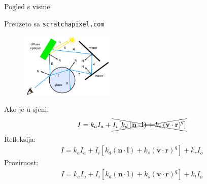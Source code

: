 \documentclass[9pt]{beamer}
\begin{document}
\begin{frame}{Pogled s visine}
\begin{tiny}
	Preuzeto sa \texttt{scratchapixel.com}
\end{tiny}

\begin{figure}
	\includegraphics[width=0.4\textwidth]{./slike/rt-whitted-example.png}	
\end{figure}
Ako je u sjeni:
\begin{align*}
I = k_aI_a + \xcancel{I_i\left[k_d\left(\mathbf{n}\cdot\mathbf{l}\right)+
k_s\left(\mathbf{v}\cdot\mathbf{r}\right)^q\right]}
\end{align*}
Refleksija:
\begin{align*}
I = k_aI_a + I_i\left[k_d\left(\mathbf{n}\cdot\mathbf{l}\right)+
	k_s\left(\mathbf{v}\cdot\mathbf{r}\right)^q\right] + k_rI_o
\end{align*}
Prozirnost:
\begin{align*}
I = k_aI_a + I_i\left[k_d\left(\mathbf{n}\cdot\mathbf{l}\right)+
k_s\left(\mathbf{v}\cdot\mathbf{r}\right)^q\right] + k_tI_o
\end{align*}
\end{frame}
\end{document}
